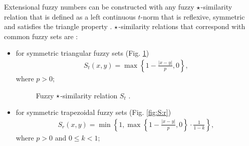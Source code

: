 \documentclass{amcs}
\newcommand{\ksR}[3]{#1\left(#2,#3\right)}
\newcommand{\Efn}{Extensional fuzzy number}
\begin{document}
\Efn s can be constructed with any fuzzy $\operatorname*{\star}$-similarity relation that is defined as a left continuous $t$-norm that is reflexive, symmetric and satisfies the triangle property \cite{id:Siminski2026Arithmetic}.
$\operatorname*{\star}$-similarity relations that correspond with common fuzzy sets are \cite{id:Siminski2026Arithmetic}:
\begin{itemize}
   \item for symmetric triangular fuzzy sets (Fig. \ref{fig:S:t})
	   \begin{align}
		\ksR{S_t}{x}{y} = \max \left\{ 1 - \frac{|x - y|}{p}, 0 \right\}, 
      \label{eq:S:t}
	\end{align}
	where $p > 0$;
      \begin{figure}
      \centering
      \caption{Fuzzy $\operatorname*{\star}$-similarity relation $S_t$ \protect\cite{id:Siminski2026Arithmetic}.}
      \label{fig:S:t}
      \end{figure}
   \item for symmetric trapezoidal fuzzy sets (Fig. \ref{fig:S:r})
	\begin{align}
		\ksR{S_r}{x}{y} = \min\left\{1, \max \left\{ 1 - \frac{|x - y|}{p}, 0 \right\} \cdot \frac{1}{1 - k}\right\}, 
      \label{eq:S:r}
	\end{align}
	where $p > 0$ and $0 \leqslant k < 1$;
   \begin{figure}
      \centering
\end{figure}
\end{itemize}
\end{document}
